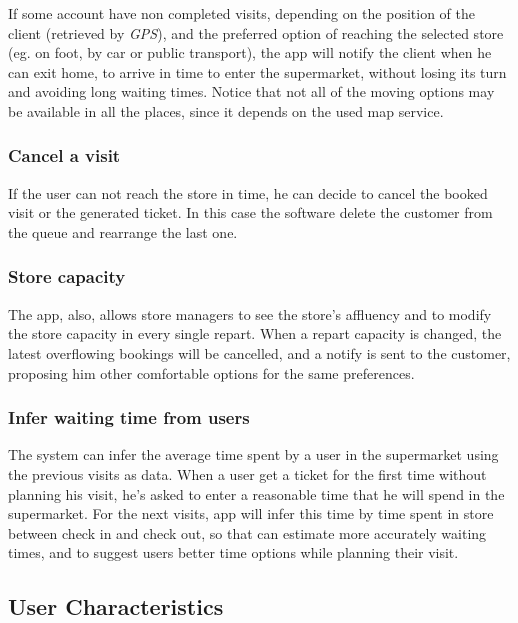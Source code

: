 \documentclass{article}
\begin{document}
		If some account have non completed visits, depending on the position of the client (retrieved by \emph{GPS}), and the preferred option of reaching the selected store (eg. on foot, by car or public transport), the app will notify the client when he can exit home, to arrive in time to enter the supermarket, without losing its turn and avoiding long waiting times. Notice that not all of the moving options may be available in all the places, since it depends on the used map service. \\
		
		\subsubsection{Cancel a visit}
		
		If the user can not reach the store in time, he can decide to cancel the booked visit or the generated ticket. In this case the software delete the customer from the queue and rearrange the last one. \\
		
		\subsubsection{Store capacity}
		
		The app, also, allows store managers to see the store's affluency and to modify the store capacity in every single repart. When a repart capacity is changed, the latest overflowing bookings will be cancelled, and a notify is sent to the customer, proposing him other comfortable options for the same preferences. \\
		
		\subsubsection{Infer waiting time from users}
		
		The system can infer the average time spent by a user in the supermarket using the previous visits as data. When a user get a ticket for the first time without planning his visit, he's asked to enter a reasonable time that he will spend in the supermarket. For the next visits, app will infer this time by time spent in store between check in and check out, so that can estimate more accurately waiting times, and to suggest users better time options while planning their visit. \\

	\subsection{User Characteristics}
	
\end{document}

